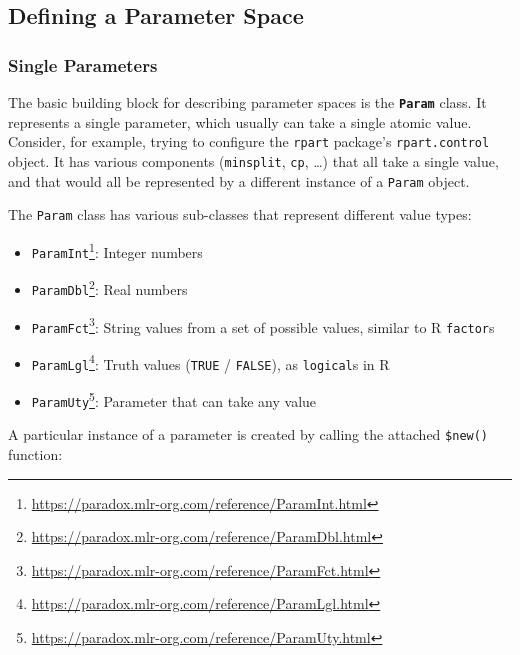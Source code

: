 \documentclass[12pt,]{scrbook}
\providecommand{\tightlist}{%
  \setlength{\itemsep}{0pt}\setlength{\parskip}{0pt}}
\renewcommand{\href}[2]{#2\footnote{\url{#1}}}
\begin{document}
\hypertarget{defining-a-parameter-space}{%
\subsection{Defining a Parameter Space}\label{defining-a-parameter-space}}

\hypertarget{single-parameters}{%
\subsubsection{Single Parameters}\label{single-parameters}}

The basic building block for describing parameter spaces is the \textbf{\texttt{Param}} class.
It represents a single parameter, which usually can take a single atomic value.
Consider, for example, trying to configure the \texttt{rpart} package's \texttt{rpart.control} object.
It has various components (\texttt{minsplit}, \texttt{cp}, \ldots{}) that all take a single value, and that would all be represented by a different instance of a \texttt{Param} object.

The \texttt{Param} class has various sub-classes that represent different value types:

\begin{itemize}
\tightlist
\item
  \href{https://paradox.mlr-org.com/reference/ParamInt.html}{\texttt{ParamInt}}: Integer numbers
\item
  \href{https://paradox.mlr-org.com/reference/ParamDbl.html}{\texttt{ParamDbl}}: Real numbers
\item
  \href{https://paradox.mlr-org.com/reference/ParamFct.html}{\texttt{ParamFct}}: String values from a set of possible values, similar to R \texttt{factor}s
\item
  \href{https://paradox.mlr-org.com/reference/ParamLgl.html}{\texttt{ParamLgl}}: Truth values (\texttt{TRUE} / \texttt{FALSE}), as \texttt{logical}s in R
\item
  \href{https://paradox.mlr-org.com/reference/ParamUty.html}{\texttt{ParamUty}}: Parameter that can take any value
\end{itemize}

A particular instance of a parameter is created by calling the attached \texttt{\$new()} function:
\end{document}
